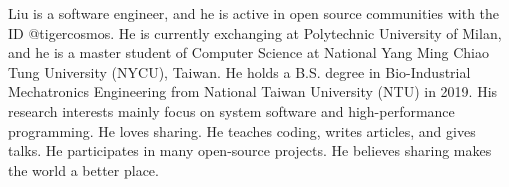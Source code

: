 

\begin{cvparagraph}

Liu is a software engineer, and he is active in open source communities with the ID @tigercosmos.
He is currently exchanging at Polytechnic University of Milan, and he is a master student of Computer Science at
National Yang Ming Chiao Tung University (NYCU), Taiwan.
He holds a B.S. degree in Bio-Industrial Mechatronics Engineering from National Taiwan University (NTU) in 2019.
His research interests mainly focus on system software and high-performance programming.
He loves sharing. He teaches coding, writes articles, and gives talks. He participates in many open-source projects.
He believes sharing makes the world a better place.
\end{cvparagraph}
